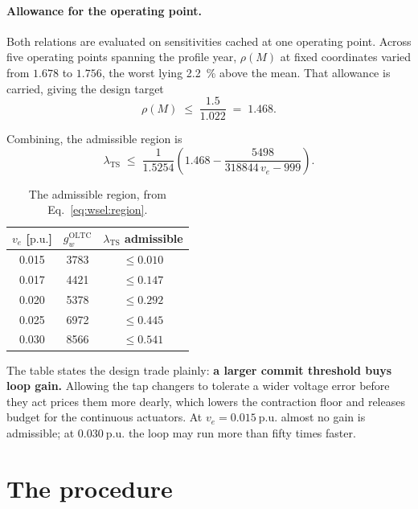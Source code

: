 \documentclass[11pt,a4paper]{article}
\newcommand{\pu}{\ensuremath{\mathrm{p.u.}}}
\newcommand{\lamts}{\ensuremath{\lambda_{\mathrm{TS}}}}
\newcommand{\gwoltc}{\ensuremath{g_{w}^{\mathrm{OLTC}}}}
\begin{document}
\paragraph{Allowance for the operating point.}
Both relations are evaluated on sensitivities cached at one operating point.
Across five operating points spanning the profile year, $\rho(M)$ at fixed
coordinates varied from $1.678$ to $1.756$, the worst lying \SI{2.2}{\percent}
above the mean. That allowance is carried, giving the design target
\begin{equation}
  \label{eq:wsel:target}
  \rho(M) \;\leq\; \frac{1.5}{1.022} \;=\; 1.468 .
\end{equation}

Combining, the admissible region is
\begin{equation}
  \label{eq:wsel:region}
  \lamts \;\leq\; \frac{1}{1.5254}
    \left( 1.468 - \frac{\num{5498}}{\num{318844}\,v_e - \num{999}} \right) .
\end{equation}

\begin{table}[htbp]
  \centering
  \caption{The admissible region, from Eq.~\eqref{eq:wsel:region}.}
  \label{tab:wsel:region}
  \begin{tabular}{ccc}
    \toprule
    $v_e$ [\pu] & \gwoltc & \lamts{} admissible \\
    \midrule
    0.015 & 3783 & $\leq 0.010$ \\
    0.017 & 4421 & $\leq 0.147$ \\
    0.020 & 5378 & $\leq 0.292$ \\
    0.025 & 6972 & $\leq 0.445$ \\
    0.030 & 8566 & $\leq 0.541$ \\
    \bottomrule
  \end{tabular}
\end{table}

The table states the design trade plainly: \textbf{a larger commit threshold
buys loop gain.} Allowing the tap changers to tolerate a wider voltage error before they
act prices them more dearly, which lowers the contraction floor and releases
budget for the continuous actuators. At $v_e = \SI{0.015}{\pu}$ almost no gain is
admissible; at $\SI{0.030}{\pu}$ the loop may run more than fifty times faster.

\section{The procedure}
\label{sec:wsel:procedure}
\end{document}
